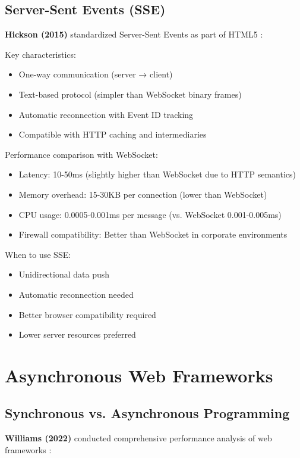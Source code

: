 \documentclass[conference]{IEEEtran}
\begin{document}
\subsection{Server-Sent Events (SSE)}

\textbf{Hickson (2015)} standardized Server-Sent Events as part of HTML5 \cite{hickson2015server}:

Key characteristics:
\begin{itemize}
    \item One-way communication (server → client)
    \item Text-based protocol (simpler than WebSocket binary frames)
    \item Automatic reconnection with Event ID tracking
    \item Compatible with HTTP caching and intermediaries
\end{itemize}

Performance comparison with WebSocket:
\begin{itemize}
    \item Latency: 10-50ms (slightly higher than WebSocket due to HTTP semantics)
    \item Memory overhead: 15-30KB per connection (lower than WebSocket)
    \item CPU usage: 0.0005-0.001ms per message (vs. WebSocket 0.001-0.005ms)
    \item Firewall compatibility: Better than WebSocket in corporate environments
\end{itemize}

When to use SSE:
\begin{itemize}
    \item Unidirectional data push
    \item Automatic reconnection needed
    \item Better browser compatibility required
    \item Lower server resources preferred
\end{itemize}

\section{Asynchronous Web Frameworks}

\subsection{Synchronous vs. Asynchronous Programming}

\textbf{Williams (2022)} conducted comprehensive performance analysis of web frameworks \cite{williams2022async}:
\end{document}
